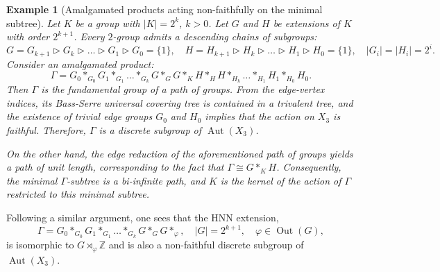 \documentclass[12pt,leqno]{amsart}
\newcommand{\2}{L^2_{\rm per}(0, T)}
\newtheorem{exm}{Example}[section]
\newcommand{\aut}{{\operatorname{Aut}}}
\numberwithin{equation}{section}
\numberwithin{figure}{section}
\begin{document}
\begin{exm}[Amalgamated products acting non-faithfully on the minimal subtree]\label{exm:non_faithful}
    Let $K$ be a group with $\lvert K\rvert = 2^k$, $k>0$. Let $G$ and $H$ be extensions of $K$ with order $2^{k+1}$. Every $2$-group admits a descending chains of subgroups:
    \[
    G = G_{k+1}\triangleright G_k\triangleright \dots \triangleright G_1\triangleright G_0 = \{1\},\quad H = H_{k+1}\triangleright H_k\triangleright \dots \triangleright H_1\triangleright H_0 = \{1\},\quad \lvert G_i\rvert = \lvert H_i\rvert = 2^i.
    \]
    Consider an amalgamated product:
    \[
    \Gamma = G_0 *_{G_0} G_1*_{G_1}\dots *_{G_k}G *_{G} G*_K H*_{H} H*_{H_k}\dots *_{H_1} H_1 *_{H_0} H_0.
    \]
    Then $\Gamma$ is the fundamental group of a path of groups. From the edge-vertex indices, its Bass-Serre universal covering tree is contained in a trivalent tree, and the existence of trivial edge groups $G_0$ and $H_0$ implies that the action on $X_3$ is faithful. Therefore, $\Gamma$ is a discrete subgroup of $\aut(X_3)$.

    On the other hand, the edge reduction of the aforementioned path of groups yields a path of unit length, corresponding to the fact that $\Gamma\cong G*_K H$. Consequently, the minimal $\Gamma$-subtree is a bi-infinite path, and $K$ is the kernel of the action of $\Gamma$ restricted to this minimal subtree.
\end{exm}
Following a similar argument, one sees that the HNN extension,
\[
\Gamma = G_0 *_{G_0} G_1 *_{G_1} \dots *_{G_k}G *_{G} G*_\varphi,\quad \lvert G\rvert = 2^{k+1},\quad \varphi\in \operatorname{Out}(G),
\]
is isomorphic to $G\rtimes_\varphi \mathbb{Z}$ and is also a non-faithful discrete subgroup of $\aut(X_3)$.
\end{document}
